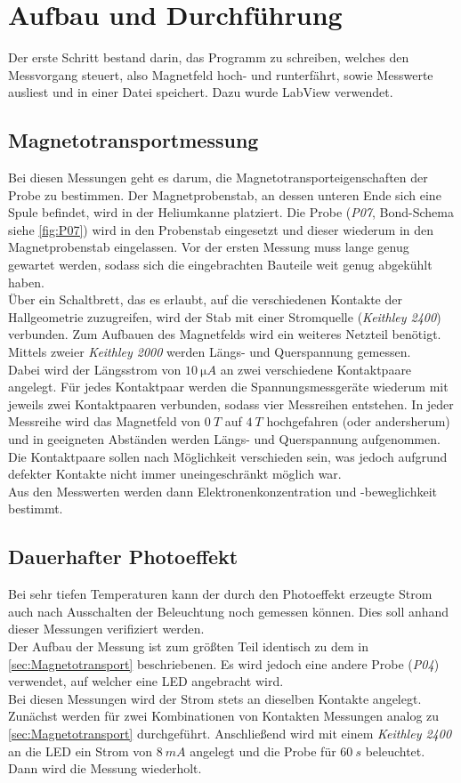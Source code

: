 \section{Aufbau und Durchführung}
Der erste Schritt bestand darin, das Programm zu schreiben, welches den Messvorgang steuert, also Magnetfeld hoch- und runterfährt, sowie Messwerte ausliest und in einer Datei speichert. Dazu wurde LabView verwendet.

\subsection{Magnetotransportmessung}\label{sec:Magnetotransport}
Bei diesen Messungen geht es darum, die Magnetotransporteigenschaften der Probe zu bestimmen.
Der Magnetprobenstab, an dessen unteren Ende sich eine Spule befindet, wird in der Heliumkanne platziert.
Die Probe (\emph{P07}, Bond-Schema siehe \autoref{fig:P07}) wird in den Probenstab eingesetzt und dieser wiederum in den Magnetprobenstab eingelassen.
Vor der ersten Messung muss lange genug gewartet werden, sodass sich die eingebrachten Bauteile weit genug abgekühlt haben.\\
Über ein Schaltbrett, das es erlaubt, auf die verschiedenen Kontakte der Hallgeometrie zuzugreifen, wird der Stab mit einer Stromquelle (\emph{Keithley 2400}) verbunden.
Zum Aufbauen des Magnetfelds wird ein weiteres Netzteil benötigt.
Mittels zweier \emph{Keithley 2000} werden Längs- und Querspannung gemessen.\\
Dabei wird der Längsstrom von $10\ \si{\micro A}$ an zwei verschiedene Kontaktpaare angelegt.
Für jedes Kontaktpaar werden die Spannungsmessgeräte wiederum mit jeweils zwei Kontaktpaaren verbunden, sodass vier Messreihen entstehen.
In jeder Messreihe wird das Magnetfeld von $0\ \si{T}$ auf $4\ \si{T}$ hochgefahren (oder andersherum) und in geeigneten Abständen werden Längs- und Querspannung aufgenommen.
Die Kontaktpaare sollen nach Möglichkeit verschieden sein, was jedoch aufgrund defekter Kontakte nicht immer uneingeschränkt möglich war.\\
Aus den Messwerten werden dann Elektronenkonzentration und -beweglichkeit bestimmt.

\subsection{Dauerhafter Photoeffekt}
Bei sehr tiefen Temperaturen kann der durch den Photoeffekt erzeugte Strom auch nach Ausschalten der Beleuchtung noch gemessen können.
Dies soll anhand dieser Messungen verifiziert werden.\\
Der Aufbau der Messung ist zum größten Teil identisch zu dem in \autoref{sec:Magnetotransport} beschriebenen. Es wird jedoch eine andere Probe (\emph{P04}) verwendet, auf welcher eine LED angebracht wird.\\
Bei diesen Messungen wird der Strom stets an dieselben Kontakte angelegt.
Zunächst werden für zwei Kombinationen von Kontakten Messungen analog zu \autoref{sec:Magnetotransport} durchgeführt.
Anschließend wird mit einem \emph{Keithley 2400} an die LED ein Strom von $8\ \si{mA}$ angelegt und die Probe für $60\ \si{s}$ beleuchtet.
Dann wird die Messung wiederholt.
